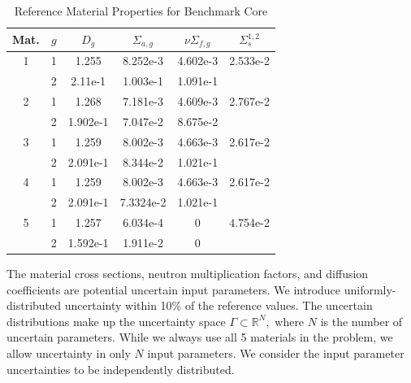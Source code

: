 \documentclass{anstrans}
\begin{document}
\begin{table}[h]
\centering
\begin{tabular}{c c | c c c c}
Mat. & $g$ & $D_g$ & $\Sigma_{a,g}$ & $\nu\Sigma_{f,g}$ & $\Sigma_s^{1,2}$ \\ \hline
1 & 1 & 1.255 & 8.252e-3 & 4.602e-3 & 2.533e-2 \\
 & 2 & 2.11e-1 & 1.003e-1 & 1.091e-1 & \\ \hline
2 & 1 & 1.268 & 7.181e-3 & 4.609e-3 & 2.767e-2 \\
 & 2 & 1.902e-1 & 7.047e-2 & 8.675e-2 & \\ \hline
3 & 1 & 1.259 & 8.002e-3 & 4.663e-3 & 2.617e-2 \\
 & 2 & 2.091e-1 & 8.344e-2 & 1.021e-1 & \\ \hline
4 & 1 & 1.259 & 8.002e-3 & 4.663e-3 & 2.617e-2 \\
 & 2 & 2.091e-1 & 7.3324e-2 & 1.021e-1 & \\ \hline
5 & 1 & 1.257 & 6.034e-4 & 0 & 4.754e-2 \\
 & 2 & 1.592e-1 & 1.911e-2 & 0 & 
\end{tabular}
\caption{Reference Material Properties for Benchmark Core}
\label{tab:coremats}
\end{table}


The material cross sections, neutron multiplication factors, and diffusion coefficients are potential uncertain input parameters.  We introduce uniformly-distributed uncertainty within 10\% of the reference values.  The uncertain distributions make up the uncertainty space $\Gamma\subset\mathbb{R}^N,$ where $N$ is the number of uncertain parameters.  While we always use all 5 materials in the problem, we allow uncertainty in only $N$ input parameters.  We consider the input parameter uncertainties to be independently distributed.
\end{document}
